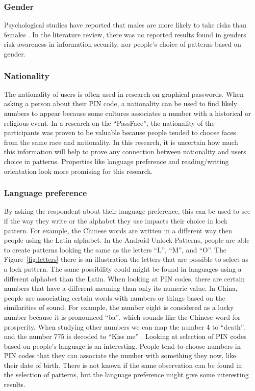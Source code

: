       \subsubsection*{Gender}
      Psychological studies have reported that males are more likely to take risks than females \cite{Byrnes}. In the literature review, there was no reported results found in genders risk awareness in information security, nor people's choice of patterns based on gender.  
      
      \subsubsection*{Nationality} The nationality of users is often used in research on graphical passwords. When asking a person about their PIN code, a nationality can be used to find likely numbers to appear because some cultures associates a number with a historical or religious event. In a research on the ``PassFace'', the nationality of the participants was proven to be valuable because people tended to choose faces from the same race and nationality. In this research, it is uncertain how much this information will help to prove any connection between nationality and users choice in patterns. Properties like language preference and reading/writing orientation look more promising for this research.
      
      \subsubsection*{Language preference} By asking the respondent about their language preference, this can be used to see if the way they write or the alphabet they use impacts their choice in lock pattern. For example, the Chinese words are written in a different way then people using the Latin alphabet. In the Android Unlock Patterns, people are able to create patterns looking the same as the letters ``L'', ``M'', and ``O''. The Figure~\ref{fig:letters} there is an illustration the letters that are possible to select as a lock pattern. The same possibility could might be found in languages using a different alphabet than the Latin. When looking at PIN codes, there are certain numbers that have a different meaning than only its numeric value. In China, people are associating certain words with numbers or things based on the similarities of sound. For example, the number eight is considered as a lucky number because it is pronounced ``ba'', which sounds like the Chinese word for prosperity. When studying other numbers we can map the number 4 to ``death'', and the number 775 is decoded to ``Kiss me'' \cite{ChineseChatCodes}. Looking at selection of PIN codes based on people's language is an interesting. People tend to choose numbers in PIN codes that they can associate the number with something they now, like their date of birth. There is not known if the same observation can be found in the selection of patterns, but the language preference might give some interesting results. 

